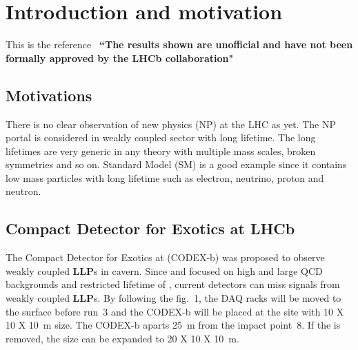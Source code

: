 \section{Introduction and motivation}
\label{sec:Introduction}

This is the reference~\cite{Gligorov:2017nwh}
\newline
\textbf{``The results shown are unofficial and have not been formally approved by the LHCb collaboration"}

\subsection{Motivations}

There is no clear observation of new physics (NP) at the LHC as yet. The NP portal is considered in weakly coupled sector with long lifetime. 
The long lifetimes are very generic in any theory with multiple mass scales, broken symmetries and so on. 
Standard Model (SM) is a good example since it contains low mass particles with long lifetime such as electron, neutrino, proton and neutron.

\subsection{Compact Detector for Exotics at LHCb}

The Compact Detector for Exotics at \lhcb (CODEX-b) was proposed to observe weakly coupled \textbf{LLP}s in \lhcb cavern. 
Since \atlas and \cms focused on high \pt and large QCD backgrounds and restricted lifetime of \lhcb, current detectors can miss signals from weakly coupled \textbf{LLP}s. 
By following the fig.~1, the DAQ racks will be moved to the surface before run~3 and the CODEX-b will be placed at the site with 10 X 10 X 10~m size. 
The CODEX-b aparts 25~m from the impact point~8. 
If the \delphi is removed, the size can be expanded to 20 X 10 X 10~m.

